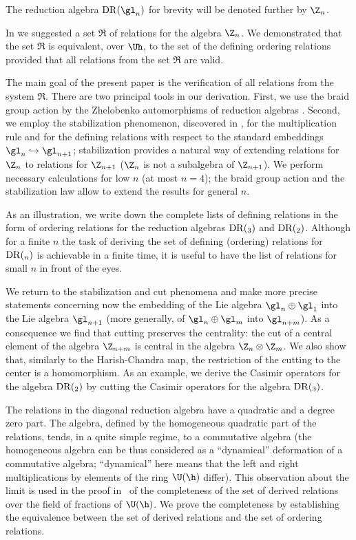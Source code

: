 \documentclass[pdftex]{sigma}
\numberwithin{equation}{section}
\begin{document}
The reduction algebra ${\mathrm{DR}}(\gl_n)$ for brevity will be denoted further by $\Z_n$.


In \cite{KO3} we suggested a set $\mathfrak{R}$ of relations for the algebra $\Z_n$.  We demonstrated that the set $\mathfrak{R}$ is equivalent, over $\Uh$,
to the set of the def\/ining ordering relations provided that all relations from the set $\mathfrak{R}$ are valid.


The main goal of the present paper is the verif\/ication of all relations from the system $\mathfrak{R}$. There are two
principal tools in our derivation. First, we use the braid group action by the  Zhelobenko automorphisms of reduction algebras \cite{Zh,KO}. Second, we
employ the stabilization phenomenon, discovered in \cite{KO3},
for the multiplication rule and for the def\/ining relations with respect to the standard embeddings
$\gl_n\hookrightarrow \gl_{n+1}$;  stabilization provides a natural way of extending relations for $\Z_{n}$ to relations for $\Z_{n+1}$ ($\Z_{n}$ is not a
subalgebra of $\Z_{n+1}$). We perform necessary calculations for low $n$ (at most $n=4$); the braid group action and the stabilization law allow
to extend the results for general $n$.


As an illustration, we write down the complete lists of def\/ining relations in the form of ordering relations for the reduction algebras ${\mathrm{DR}}(\sl_3)$
and ${\mathrm{DR}}(\sl_2)$. Although for a f\/inite $n$ the task of deriving the set of def\/ining (ordering) relations for ${\mathrm{DR}}(\sl_n)$ is achievable in a f\/inite time, it is useful to have the list of relations for small $n$ in front of the eyes.


We return to the stabilization and cut phenomena and make more precise statements concerning now the embedding of the Lie algebra $\gl_n\oplus\gl_1$
into the Lie algebra $\gl_{n+1}$ (more generally, of $\gl_n\oplus\gl_m$ into $\gl_{n+m}$). As a consequence we f\/ind that cutting preserves the centrality:
the cut of a central element of the algebra $\Z_{n+m}$ is central in the algebra $\Z_n\otimes\Z_m$.
We also show that, similarly to the Harish-Chandra map, the restriction of the cutting to the center is a homomorphism. As an example, we
derive the Casimir operators for the algebra ${\mathrm{DR}}(\sl_2)$ by cutting the Casimir operators for the algebra ${\mathrm{DR}}(\sl_3)$.


The relations in the diagonal reduction algebra have a quadratic and a degree zero part. The algebra, def\/ined by the homogeneous quadratic part
of the relations, tends, in a quite simple regime, to a commutative algebra (the homogeneous algebra can be thus considered as a ``dynamical''
deformation of a commutative algebra; ``dynamical'' here means that the left and right multiplications by elements of the ring $\U (\h )$ dif\/fer). This observation
about the limit is used in the proof in~\cite{KO3} of the completeness of the set of derived relations over the f\/ield of
fractions of $\U(\h)$. We prove the completeness by establishing the equivalence between the set of derived relations and the set of ordering relations.
\end{document}
